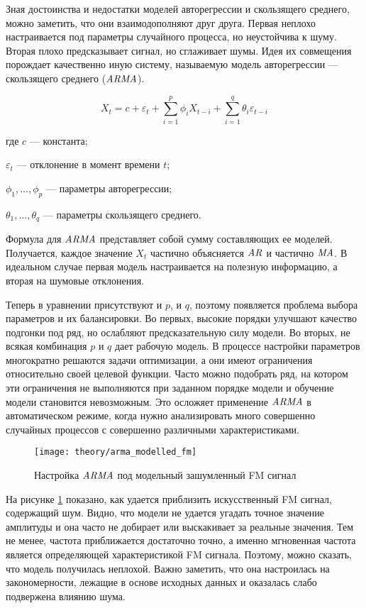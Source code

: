 Зная достоинства и недостатки моделей авторегрессии и скользящего среднего, можно заметить, что они взаимодополняют друг друга. Первая неплохо настраивается под параметры случайного процесса, но неустойчива к шуму. Вторая плохо предсказывает сигнал, но сглаживает шумы. Идея их совмещения порождает качественно иную систему, называемую модель авторегрессии --- скользящего среднего ($\mathit{ARMA}$).

\begin{equation}
  \label{eq:theory:arma}
  X_t = c + \varepsilon_t + \sum_{i=1}^p \phi_i X_{t-i} + \sum_{i=1}^q \theta_i \varepsilon_{t-i}
\end{equation}
\begin{explanation}
\item[где] $c$ --- константа;
\item $\varepsilon_t$ --- отклонение в момент времени $t$;
\item $\phi_1, \dotsc, \phi_p$ --- параметры авторегрессии;
\item $\theta_1, \dotsc, \theta_q$ --- параметры скользящего среднего.
\end{explanation}

Формула для $\mathit{ARMA}$ представляет собой сумму составляющих ее моделей. Получается, каждое значение $X_t$ частично объясняется $\mathit{AR}$ и частично $\mathit{MA}$. В идеальном случае первая модель настраивается на полезную информацию, а вторая на шумовые отклонения.

Теперь в уравнении присутствуют и $p$, и $q$, поэтому появляется проблема выбора параметров и их балансировки. Во первых, высокие порядки улучшают качество подгонки под ряд, но ослабляют предсказательную силу модели. Во вторых, не всякая комбинация $p$ и $q$ дает рабочую модель. В процессе настройки параметров многократно решаются задачи оптимизации, а они имеют ограничения относительно своей целевой функции. Часто можно подобрать ряд, на котором эти ограничения не выполняются при заданном порядке модели и обучение модели становится невозможным. Это осложяет применение $\mathit{ARMA}$ в автоматическом режиме, когда нужно анализировать много совершенно случайных процессов с совершенно различными характеристиками.

\begin{figure}[h]
  \centering
  \texttt{[image: theory/arma\_modelled\_fm]}
  \caption{Настройка $\mathit{ARMA}$ под модельный зашумленный FM сигнал}
  \label{fig:theory:arma_modelled_fm}
\end{figure}

На рисунке \ref{fig:theory:arma_modelled_fm} показано, как удается приблизить искусственный FM сигнал, содержащий шум. Видно, что модели не удается угадать точное значение амплитуды и она часто не добирает или выскакивает за реальные значения. Тем не менее, частота приближается достаточно точно, а именно мгновенная частота является определяющей характеристикой FM сигнала. Поэтому, можно сказать, что модель получилась неплохой. Важно заметить, что она настроилась на закономерности, лежащие в основе исходных данных и оказалась слабо подвержена влиянию шума.

